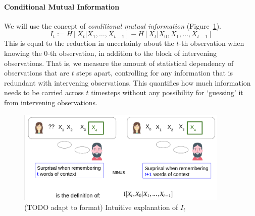 \documentclass[11pt,letterpaper]{article}
\begin{document}




\paragraph{Conditional Mutual Information}

We will use the concept of \emph{conditional mutual information} (Figure~\ref{fig:it-surprisal-intuition}).
\begin{equation}
	I_t := H[X_t| X_1, \dots, X_{t-1}] - H[X_t| X_0, X_1, \dots, X_{t-1}]
\end{equation}
This is equal to the reduction in uncertainty about the $t$-th observation when knowing the $0$-th observation, in addition to the block of intervening observations.
That is, we measure the amount of statistical dependency of observations that are $t$ steps apart, controlling for any information that is redundant with intervening observations.
This quantifies how much information needs to be carried across $t$ timesteps without any possibility for `guessing' it from intervening observations.



\begin{figure}
\includegraphics[width=0.9\textwidth]{figures/listener-it.png}
	\caption{(TODO adapt to format) Intuitive explanation of $I_t$}\label{fig:it-surprisal-intuition}
\end{figure}
\end{document}
